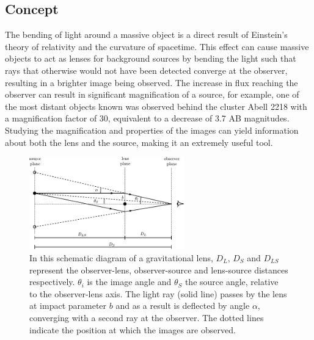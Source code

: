 	\subsection{Concept} %
	\label{sub:concept}
		The bending of light around a massive object is a direct result of Einstein's theory of relativity and the curvature of spacetime. This effect can cause massive objects to act as lenses for background sources by bending the light such that rays that otherwise would not have been detected converge at the observer, resulting in a brighter image being observed. The increase in flux reaching the observer can result in significant magnification of a source, for example, one of the most distant objects known was observed behind the cluster Abell 2218 with a magnification factor of 30, equivalent to a decrease of 3.7 AB magnitudes\cite{Distant_object_Abell2218}. Studying the magnification and properties of the images can yield information about both the lens and the source, making it an extremely useful tool\cite{Hartle}.
		\begin{figure}[htbp]
			\centering
				\includegraphics[width=0.6\textwidth]{../Images/Lensing_light_bending.pdf}
			\caption[Diagram of a gravitational lens]{In this schematic diagram of a gravitational lens, $D_L$, $D_S$ and $D_{LS}$ represent the observer-lens, observer-source and lens-source distances respectively. $\theta_i$ is the image angle and $\theta_S$ the source angle, relative to the observer-lens axis. The light ray (solid line) passes by the lens at impact parameter $b$ and as a result is deflected by angle $\alpha$, converging with a second ray at the observer. The dotted lines indicate the position at which the images are observed\cite{Lensing_light_bending_diagram}.\label{fig:Lensing_light_bending}}
		\end{figure}

